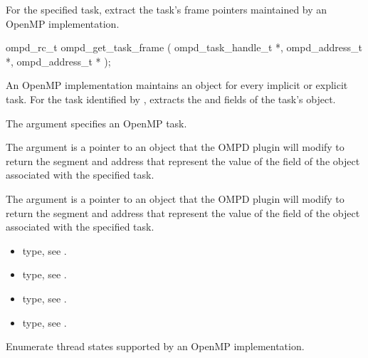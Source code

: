 %
\label{subsubsubsec:ompd_get_task_frame}
\summary
For the specified task, extract the task's frame pointers maintained by an OpenMP implementation.

\format
\begin{cspecific}
\begin{ompSyntax}
ompd_rc_t ompd_get_task_frame (
  ompd_task_handle_t *,
  ompd_address_t *,
  ompd_address_t *
);
\end{ompSyntax}
\end{cspecific}

\descr
An OpenMP implementation  maintains an  object for every implicit or explicit task.
For the task identified by ,  extracts
the  and  fields of the task's  object.

\argdesc

The argument  specifies an OpenMP task.

The argument  is a pointer to an  object that the OMPD plugin will
modify to return the segment and address that represent the value of the 
field of the  object associated with the specified task.

The argument  is a pointer to an  object that the OMPD plugin will
modify to return the segment and address that represent the value of the 
field of the  object associated with the specified task.

\crossreferences
\begin{itemize}
  \item {} type, see .
	\item {} type, see .
	\item {} type, see .
	\item {} type, see .
\end{itemize}


\label{subsubsubsec:ompd_enumerate_states}

\summary
Enumerate thread states supported by an OpenMP implementation.

